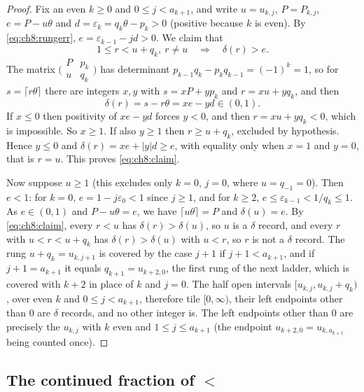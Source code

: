 \begin{proof}
Fix an even $k\geq0$ and $0\leq j<a_{k+1}$, and write $u=u_{k,j}$,
$P=P_{k,j}$, $e=P-u\theta$ and $d=\varepsilon_k=q_k\theta-p_k>0$ (positive
because $k$ is even). By \eqref{eq:ch8:rungerr}, $e=\varepsilon_{k-1}-jd>0$.
We claim that
\begin{equation}\label{eq:ch8:claim}
  1\leq r<u+q_k,\ r\neq u\quad\Longrightarrow\quad\delta(r)>e .
\end{equation}
The matrix
$\bigl(\begin{smallmatrix}P&p_k\\u&q_k\end{smallmatrix}\bigr)$ has
determinant $p_{k-1}q_k-p_kq_{k-1}=(-1)^k=1$, so for $s=\lceil r\theta\rceil$
there are integers $x,y$ with $s=xP+yp_k$ and $r=xu+yq_k$, and then
\[
  \delta(r)=s-r\theta=xe-yd\in(0,1).
\]
If $x\leq0$ then positivity of $xe-yd$ forces $y<0$, and then $r=xu+yq_k<0$,
which is impossible. So $x\geq1$. If also $y\geq1$ then $r\geq u+q_k$,
excluded by hypothesis. Hence $y\leq0$ and $\delta(r)=xe+|y|d\geq e$, with
equality only when $x=1$ and $y=0$, that is $r=u$. This proves
\eqref{eq:ch8:claim}.

Now suppose $u\geq1$ (this excludes only $k=0$, $j=0$, where $u=q_{-1}=0$).
Then $e<1$: for $k=0$, $e=1-j\varepsilon_0<1$ since $j\geq1$, and for $k\geq2$,
$e\leq\varepsilon_{k-1}<1/q_k\leq1$. As $e\in(0,1)$ and $P-u\theta=e$, we have
$\lceil u\theta\rceil=P$ and $\delta(u)=e$. By \eqref{eq:ch8:claim}, every
$r<u$ has $\delta(r)>\delta(u)$, so $u$ is a $\delta$ record, and every $r$
with $u<r<u+q_k$ has $\delta(r)>\delta(u)$ with $u<r$, so $r$ is not a
$\delta$ record. The rung $u+q_k=u_{k,j+1}$ is covered by the case $j+1$ if
$j+1<a_{k+1}$, and if $j+1=a_{k+1}$ it equals $q_{k+1}=u_{k+2,0}$, the first
rung of the next ladder, which is covered with $k+2$ in place of $k$ and
$j=0$. The half open intervals $[u_{k,j},u_{k,j}+q_k)$, over even $k$ and
$0\leq j<a_{k+1}$, therefore tile $[0,\infty)$, their left endpoints other
than $0$ are $\delta$ records, and no other integer is. The left endpoints
other than $0$ are precisely the $u_{k,j}$ with $k$ even and $1\leq j\leq
a_{k+1}$ (the endpoint $u_{k+2,0}=u_{k,a_{k+1}}$ being counted once).
\end{proof}

\subsection{The continued fraction of $\lt$}

